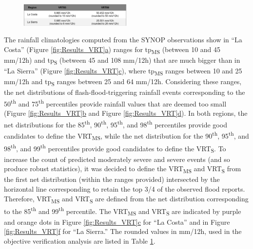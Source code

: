 \documentclass[techmemo]{ecmwfrep}%
\begin{document}
\begin{figure}
\centering
{}
\includegraphics[width=0.5\textwidth]{Tables/04_VRTs.png}
\label{table:VRTs}
\end{figure}

The rainfall climatologies computed from the SYNOP observations show in “La Costa” (Figure \ref{fig:Results_VRT}\hyperref[fig:Results_VRT]{a}) ranges for tp\textsubscript{MS} (between 10 and 45 mm/12h) and tp\textsubscript{S} (between 45 and 108 mm/12h) that are much bigger than in “La Sierra” (Figure \ref{fig:Results_VRT}\hyperref[fig:Results_VRT]{c}), where tp\textsubscript{MS} ranges between 10 and 25 mm/12h and tp\textsubscript{S} ranges between 25 and 64 mm/12h. Considering these ranges, the net distributions of flash-flood-triggering rainfall events corresponding to the 50\textsuperscript{th} and 75\textsuperscript{th} percentiles provide rainfall values that are deemed too small (Figure \ref{fig:Results_VRT}\hyperref[fig:Results_VRT]{b} and Figure \ref{fig:Results_VRT}\hyperref[fig:Results_VRT]{d}). In both regions, the net distributions for the 85\textsuperscript{th}, 90\textsuperscript{th}, 95\textsuperscript{th}, and 98\textsuperscript{th} percentiles provide good candidates to define the VRT\textsubscript{MS}, while the net distribution for the 90\textsuperscript{th}, 95\textsuperscript{th}, and 98\textsuperscript{th}, and 99\textsuperscript{th} percentiles provide good candidates to define the VRT\textsubscript{S}. To increase the count of predicted moderately severe and severe events (and so produce robust statistics), it was decided to define the VRT\textsubscript{MS} and VRT\textsubscript{S} from the first net distribution (within the ranges provided) intersected by the horizontal line corresponding to retain the top 3/4 of the observed flood reports. Therefore, VRT\textsubscript{MS} and VRT\textsubscript{S} are defined from the net distribution corresponding to the 85\textsuperscript{th} and 99\textsuperscript{th} percentile. The VRT\textsubscript{MS} and VRT\textsubscript{S} are indicated by purple and orange dots in Figure \ref{fig:Results_VRT}\hyperref[fig:Results_VRT]{c} for “La Costa” and in Figure \ref{fig:Results_VRT}\hyperref[fig:Results_VRT]{f} for “La Sierra.” The rounded values in mm/12h, used in the objective verification analysis are listed in Table \ref{table:VRTs}.
\end{document}
